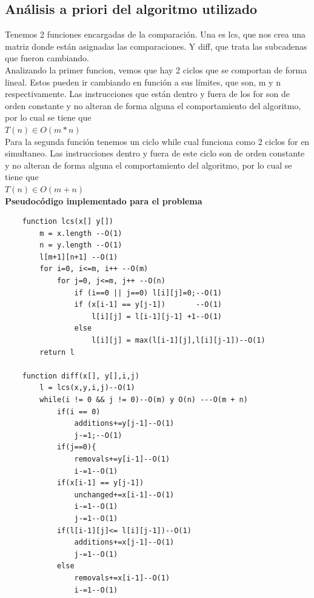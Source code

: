 \documentclass{article}
\begin{document}
    \subsection{Análisis a priori del algoritmo utilizado }
    Tenemos 2 funciones encargadas de la comparación. Una es lcs, que nos crea una matriz donde están asignadas las comparaciones. Y diff, que trata las subcadenas que fueron cambiando. \\
    Analizando la primer funcion, vemos que hay 2 ciclos que se comportan de forma lineal. Estos pueden ir cambiando en función a sus límites, que son, m y n respectivamente. Las instrucciones que están dentro y fuera de los for son de orden constante y no alteran de forma alguna el comportamiento del algoritmo, por lo cual se tiene que \\
    $T(n) \in O(m*n)$\\
    Para la segunda función tenemos un ciclo while cual funciona como 2 ciclos for en simultaneo. Las instrucciones dentro y fuera de este ciclo son de orden constante y no alteran de forma alguna el comportamiento del algoritmo, por lo cual se tiene que\\
    $T(n) \in O(m + n)$\\
     \textbf{Pseudocódigo implementado para el problema}
        \begin{verbatim}
    function lcs(x[] y[])
        m = x.length --O(1)
        n = y.length --O(1)
        l[m+1][n+1] --O(1)
        for i=0, i<=m, i++ --O(m)
            for j=0, j<=m, j++ --O(n)
                if (i==0 || j==0) l[i][j]=0;--O(1)
                if (x[i-1] == y[j-1])       --O(1)
                    l[i][j] = l[i-1][j-1] +1--O(1)
                else
                    l[i][j] = max(l[i-1][j],l[i][j-1])--O(1)
        return l
    
    function diff(x[], y[],i,j)
        l = lcs(x,y,i,j)--O(1)
        while(i != 0 && j != 0)--O(m) y O(n) ---O(m + n)
            if(i == 0)
                additions+=y[j-1]--O(1)         
                j-=1;--O(1)
            if(j==0){
                removals+=y[i-1]--O(1)
                i-=1--O(1)
            if(x[i-1] == y[j-1])
                unchanged+=x[i-1]--O(1)
                i-=1--O(1)
                j-=1--O(1)
            if(l[i-1][j]<= l[i][j-1])--O(1)
                additions+=x[j-1]--O(1)
                j-=1--O(1)
            else
                removals+=x[i-1]--O(1)
                i-=1--O(1)
            
            
        \end{verbatim}
    
\end{document}

